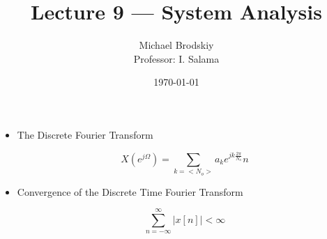 


\title{Lecture 9 — System Analysis}
\date{\today}
\author{Michael Brodskiy\\ \small Professor: I. Salama}



\maketitle

\begin{itemize}

  \item The Discrete Fourier Transform

    $$X(e^{j\Omega})=\sum_{k=<N_o>}a_ke^{jk\frac{2\pi}{N_o}}n$$

  \item Convergence of the Discrete Time Fourier Transform

    $$\sum_{n=-\infty}^{\infty}|x[n]|<\infty$$

\end{itemize}



